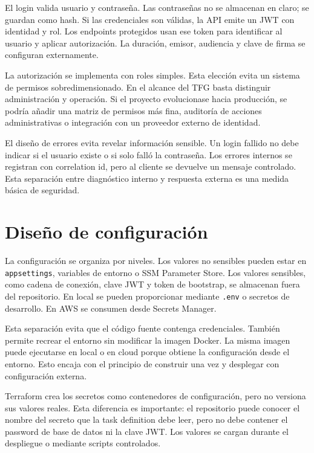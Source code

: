 El login valida usuario y contraseña. Las contraseñas no se almacenan en claro; se guardan como hash. Si las credenciales son válidas, la API emite un JWT con identidad y rol. Los endpoints protegidos usan ese token para identificar al usuario y aplicar autorización. La duración, emisor, audiencia y clave de firma se configuran externamente.

La autorización se implementa con roles simples. Esta elección evita un sistema de permisos sobredimensionado. En el alcance del TFG basta distinguir administración y operación. Si el proyecto evolucionase hacia producción, se podría añadir una matriz de permisos más fina, auditoría de acciones administrativas o integración con un proveedor externo de identidad.

El diseño de errores evita revelar información sensible. Un login fallido no debe indicar si el usuario existe o si solo falló la contraseña. Los errores internos se registran con correlation id, pero al cliente se devuelve un mensaje controlado. Esta separación entre diagnóstico interno y respuesta externa es una medida básica de seguridad.

\section{Diseño de configuración}
\label{sec:diseno-configuracion}

La configuración se organiza por niveles. Los valores no sensibles pueden estar en \texttt{appsettings}, variables de entorno o SSM Parameter Store. Los valores sensibles, como cadena de conexión, clave JWT y token de bootstrap, se almacenan fuera del repositorio. En local se pueden proporcionar mediante \texttt{.env} o secretos de desarrollo. En AWS se consumen desde Secrets Manager.

Esta separación evita que el código fuente contenga credenciales. También permite recrear el entorno sin modificar la imagen Docker. La misma imagen puede ejecutarse en local o en cloud porque obtiene la configuración desde el entorno. Esto encaja con el principio de construir una vez y desplegar con configuración externa.

Terraform crea los secretos como contenedores de configuración, pero no versiona sus valores reales. Esta diferencia es importante: el repositorio puede conocer el nombre del secreto que la task definition debe leer, pero no debe contener el password de base de datos ni la clave JWT. Los valores se cargan durante el despliegue o mediante scripts controlados.

